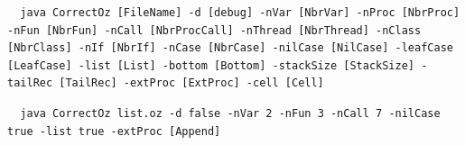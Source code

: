 \documentclass[11pt,a4paper,twoside,openright]{report}
\begin{document}
\begin{lstlisting}
  java CorrectOz [FileName] -d [debug] -nVar [NbrVar] -nProc [NbrProc] -nFun [NbrFun] -nCall [NbrProcCall] -nThread [NbrThread] -nClass [NbrClass] -nIf [NbrIf] -nCase [NbrCase] -nilCase [NilCase] -leafCase [LeafCase] -list [List] -bottom [Bottom] -stackSize [StackSize] -tailRec [TailRec] -extProc [ExtProc] -cell [Cell]
\end{lstlisting}
  \label{fig:cmd}
  
  \begin{lstlisting}
  java CorrectOz list.oz -d false -nVar 2 -nFun 3 -nCall 7 -nilCase true -list true -extProc [Append]
\end{lstlisting}
  \label{fig:ex}
\end{document}
